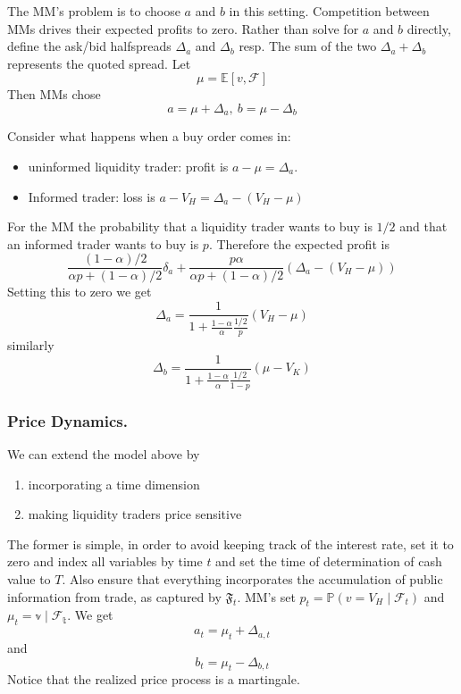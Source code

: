 \documentclass[11pt,a4paper]{article}
\theoremstyle{definition}
\theoremstyle{plain}
\theoremstyle{remark}
\newcommand{\1}{\mathbbm{1}}
\begin{document}
The MM's problem is to choose $a$ and $b$ in this setting. Competition between MMs drives their expected profits to zero. 
Rather than solve for $a$ and $b$ directly, define the ask/bid halfspreads $\Delta_a$ and $\Delta_b$ resp. 
The sum of the two $\Delta_a + \Delta_b$ represents the quoted spread. Let 
$$\mu = \mathbb{E} [v, \mathcal{F}]$$
Then MMs chose 
$$a = \mu + \Delta_a, \ b = \mu - \Delta_b$$

Consider what happens when a buy order comes in: 
\begin{itemize}
    \item uninformed liquidity trader: profit is $a - \mu = \Delta_a$. 
    \item Informed trader: loss is $a - V_H = \Delta_a - (V_H - \mu)$
\end{itemize}
For the MM the probability that a liquidity trader wants to buy is $1/2$ and that an informed trader 
wants to buy is $p$. Therefore the expected profit is 
$$\frac{(1-\alpha)/2}{\alpha p + (1-\alpha)/2} \delta_a + \frac{p \alpha}{\alpha p + (1-\alpha)/2} (\Delta_a - (V_H - \mu))$$
Setting this to zero we get 
$$\Delta_a = \frac{1}{1 + \frac{1-\alpha}{\alpha} \frac{1/2}{p}} (V_H - \mu)$$
similarly 
$$\Delta_b =  \frac{1}{1 + \frac{1-\alpha}{\alpha} \frac{1/2}{1-p}} (\mu - V_K)$$

\subsubsection{Price Dynamics.}
We can extend the model above by 
\begin{enumerate}
    \item incorporating a time dimension
    \item making liquidity traders price sensitive
\end{enumerate}
The former is simple, in order to avoid keeping track of the interest rate, set it to zero and index all variables 
by time $t$ and set the time of determination of cash value to $T$. 
Also ensure that everything incorporates the accumulation of public information from trade, as captured by $\mathfrak{F}_t$. 
MM's set $p_t = \mathbb{P}(v = V_H \mid \mathcal{F}_t)$ and $\mu_t = \mathbb{v \mid \mathcal{F}_t}$. We get 
$$a_t = \mu_t + \Delta_{a,t}$$
and 
$$b_t = \mu_t - \Delta_{b, t}$$
Notice that the realized price process is a martingale. 
\end{document}
